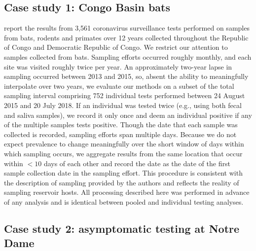 \documentclass{article}
\begin{document}
\subsection{Case study 1: Congo Basin bats}
\cite{kumakamba2021coronavirus} report the results from 3,561 coronavirus surveillance tests performed on samples from bats, rodents and primates over 12 years collected throughout the Republic of Congo and Democratic Republic of Congo. We restrict our attention to samples collected from bats. Sampling efforts occurred roughly monthly, and each site was visited roughly twice per year. An approximately two-year lapse in sampling occurred between 2013 and 2015, so, absent the ability to meaningfully interpolate over two years, we evaluate our methods on a subset of the total sampling interval comprising 752 individual tests performed between 24 August 2015 and 20 July 2018. If an individual was tested twice (e.g., using both fecal and saliva samples), we record it only once and deem an individual positive if any of the multiple samples tests positive. Though the date that each sample was collected is recorded, sampling efforts span multiple days. Because we do not expect prevalence to change meaningfully over the short window of days within which sampling occurs, we aggregate results from the same location that occur within $<10$ days of each other and record the date as the date of the first sample collection date in the sampling effort. This procedure is consistent with the description of sampling provided by the authors and reflects the reality of sampling reservoir hosts. All processing described here was performed in advance of any analysis and is identical between pooled and individual testing analyses.

\subsection{Case study 2: asymptomatic testing at Notre Dame}
\end{document}
